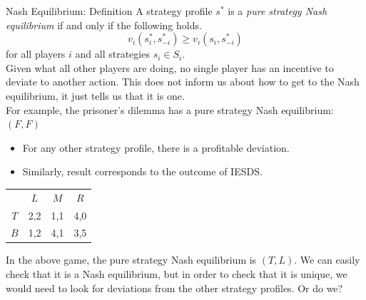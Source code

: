 \documentclass[8pt]{extarticle}
\begin{document}
  \begin{problem}{Nash Equilibrium: Definition}
    A strategy profile $s^{*}$ is a \textit{pure strategy Nash equilibrium} if and only if the following holds.
    \[
      v_i(s^{*}_i,s^{*}_{-i}) \geq v_i (s_i,s^{*}_{-i})
    \] 
    for all players $i$ and all strategies $s_i\in S_i$.\\

    Given what all other players are doing, no single player has an incentive to deviate to another action. This does not inform us about how to get to the Nash equilibrium, it just tells us that it is one.\\

    For example, the prisoner's dilemma has a pure strategy Nash equilibrium: $(F,F)$
    \begin{itemize}
      \item For any other strategy profile, there is a profitable deviation.
      \item Similarly, result corresponds to the outcome of IESDS.
    \end{itemize}
    \begin{center}
      \renewcommand{\arraystretch}{1.25}
      \begin{tabular}{c|c|c|c|}
        \multicolumn{1}{c}{} & \multicolumn{1}{c}{$L$} & \multicolumn{1}{c}{$M$} & \multicolumn{1}{c}{$R$}\\\cline{2-4}
        $T$ & 2,2 & 1,1 & 4,0 \\\cline{2-4}
        $B$ & 1,2 & 4,1 & 3,5 \\\cline{2-4}
      \end{tabular}
    \end{center}
    In the above game, the pure strategy Nash equilibrium is $(T,L)$. We can easily check that it is a Nash equilibrium, but in order to check that it is unique, we would need to look for deviations from the other strategy profiles. Or do we?
  \end{problem}
\end{document}
